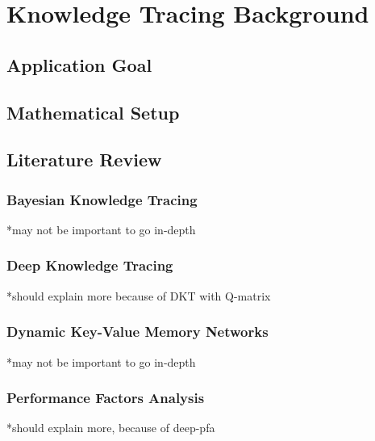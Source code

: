\chapter{Knowledge Tracing Background}

\section{Application Goal}

\section{Mathematical Setup}

\section{Literature Review}

\subsection{Bayesian Knowledge Tracing}
*may not be important to go in-depth

\subsection{Deep Knowledge Tracing}
*should explain more because of DKT with Q-matrix

\subsection{Dynamic Key-Value Memory Networks}
*may not be important to go in-depth

\subsection{Performance Factors Analysis}
*should explain more, because of deep-pfa

